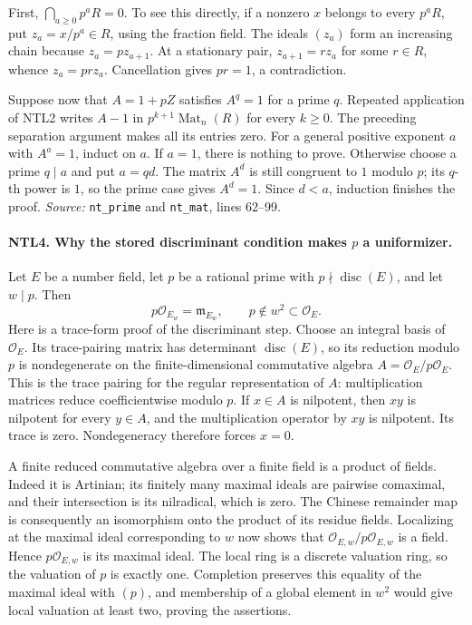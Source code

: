 First, \(\bigcap_{a\ge0}p^aR=0\).  To see this directly, if a nonzero
\(x\) belongs to every \(p^aR\), put \(z_a=x/p^a\in R\), using the
fraction field.  The ideals \((z_a)\) form an increasing chain because
\(z_a=pz_{a+1}\).  At a stationary pair,
\(z_{a+1}=r z_a\) for some \(r\in R\), whence
\(z_a=prz_a\).  Cancellation gives \(pr=1\), a contradiction.

Suppose now that \(A=1+pZ\) satisfies \(A^q=1\) for a prime \(q\).
Repeated application of NTL2 writes \(A-1\) in
\(p^{k+1}\operatorname{Mat}_n(R)\) for every \(k\ge0\).
The preceding separation argument makes all its entries zero.
For a general positive exponent \(a\) with \(A^a=1\), induct on \(a\).
If \(a=1\), there is nothing to prove.  Otherwise choose a prime
\(q\mid a\) and put \(a=qd\).  The matrix \(A^d\) is still congruent
to \(1\) modulo \(p\); its \(q\)-th power is \(1\), so the prime case
gives \(A^d=1\).  Since \(d<a\), induction finishes the proof.
\emph{Source:} \texttt{nt\_prime} and \texttt{nt\_mat}, lines 62--99.

\paragraph{NTL4. Why the stored discriminant condition makes \(p\) a uniformizer.}
\label{claim:NTL4}
Let \(E\) be a number field, let \(p\) be a rational prime with
\(p\nmid\operatorname{disc}(E)\), and let \(w\mid p\).  Then
\[
 p\mathcal O_{E_w}=\mathfrak m_{E_w},
 \qquad p\notin w^2\subset\mathcal O_E.
\]
Here is a trace-form proof of the discriminant step.  Choose an integral
basis of \(\mathcal O_E\).  Its trace-pairing matrix has determinant
\(\operatorname{disc}(E)\), so its reduction modulo \(p\) is
nondegenerate on the finite-dimensional commutative algebra
\(A=\mathcal O_E/p\mathcal O_E\).  This is the trace pairing for the
regular representation of \(A\): multiplication matrices reduce
coefficientwise modulo \(p\).  If \(x\in A\) is nilpotent, then
\(xy\) is nilpotent for every \(y\in A\), and the multiplication
operator by \(xy\) is nilpotent.  Its trace is zero.  Nondegeneracy
therefore forces \(x=0\).

A finite reduced commutative algebra over a finite field is a product
of fields.  Indeed it is Artinian; its finitely many maximal ideals
are pairwise comaximal, and their intersection is its nilradical,
which is zero.  The Chinese remainder map is consequently an
isomorphism onto the product of its residue fields.  Localizing at
the maximal ideal corresponding to \(w\) now shows that
\(\mathcal O_{E,w}/p\mathcal O_{E,w}\) is a field.  Hence
\(p\mathcal O_{E,w}\) is its maximal ideal.  The local ring is a
discrete valuation ring, so the valuation of \(p\) is exactly one.
Completion preserves this equality of the maximal ideal with
\((p)\), and membership of a global element in \(w^2\) would give
local valuation at least two, proving the assertions.

